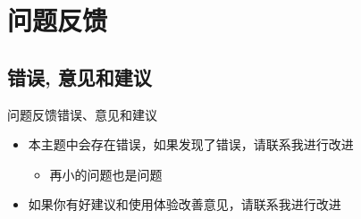 \section{问题反馈}
\subsection{错误, 意见和建议}
\begin{frame}{问题反馈}{错误、意见和建议}
  \begin{itemize}
  \item 本主题中会存在错误，如果发现了错误，请联系我进行改进
    \begin{itemize}
    \item \alert{再小的问题也是问题}
    \end{itemize}
  \item 如果你有好建议和使用体验改善意见，请联系我进行改进
  \end{itemize}
\end{frame}


